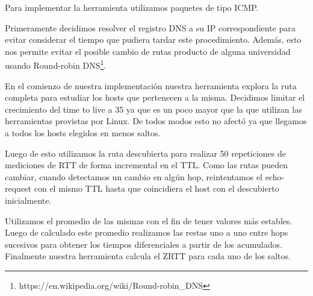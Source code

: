 Para implementar la herramienta utilizamos paquetes de tipo ICMP.

Primeramente decidimos resolver el registro DNS a su IP correspondiente para evitar considerar el tiempo que pudiera tardar este procedimiento. Además, esto nos permite evitar el posible cambio de rutas producto de alguna universidad usando Round-robin DNS\footnote{https://en.wikipedia.org/wiki/Round-robin\_DNS}.

En el comienzo de nuestra implementación nuestra herramienta explora la ruta completa para estudiar los hosts que pertenecen a la misma.
Decidimos limitar el crecimiento del time to live a 35 ya que es un poco mayor que la que utilizan las herramientas provistas por Linux.
De todos modos esto no afectó ya que llegamos a todos los hosts elegidos en menos saltos.

Luego de esto utilizamos la ruta descubierta para realizar 50 repeticiones de mediciones de RTT de forma incremental en el TTL.
Como las rutas pueden cambiar, cuando detectamos un cambio en algún hop, reintentamos el echo-request con el mismo TTL hasta que coincidiera el host con el descubierto inicialmente.

Utilizamos el promedio de las mismas con el fin de tener valores más estables.
Luego de calculado este promedio realizamos las restas uno a uno entre hops sucesivos para obtener los tiempos diferenciales a partir de los acumulados.
Finalmente nuestra herramienta calcula el ZRTT para cada uno de los saltos.
